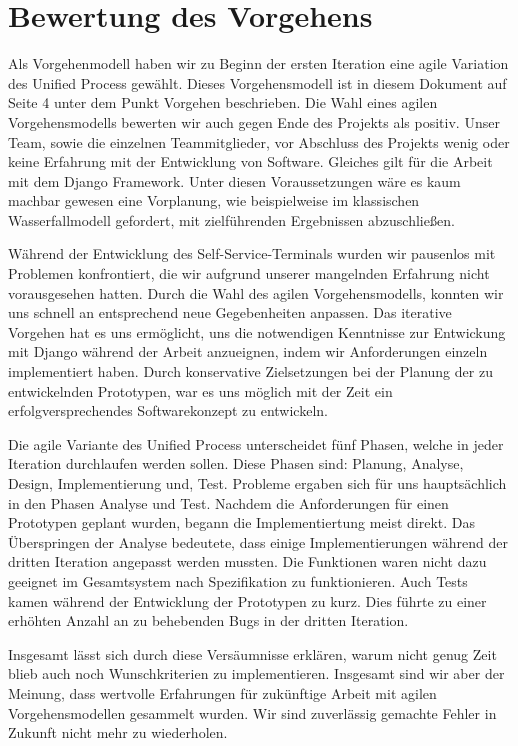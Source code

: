 \section{Bewertung des Vorgehens}

Als Vorgehenmodell haben wir zu Beginn der ersten Iteration eine agile Variation des Unified Process gewählt. Dieses Vorgehensmodell ist in diesem Dokument auf Seite 4 unter dem Punkt  \glqq Vorgehen\grqq{} beschrieben. Die Wahl eines agilen Vorgehensmodells bewerten wir auch gegen Ende des Projekts als positiv. Unser Team, sowie die einzelnen Teammitglieder, vor Abschluss des Projekts wenig oder keine Erfahrung mit der Entwicklung von Software. Gleiches gilt für die Arbeit mit dem Django Framework. Unter diesen Voraussetzungen wäre es kaum machbar gewesen eine Vorplanung, wie beispielweise im klassischen Wasserfallmodell gefordert, mit zielführenden Ergebnissen abzuschließen. \par
\noindent Während der Entwicklung des Self-Service-Terminals wurden wir pausenlos mit Problemen konfrontiert, die wir aufgrund unserer mangelnden Erfahrung nicht vorausgesehen hatten. Durch die Wahl des agilen Vorgehensmodells, konnten wir uns schnell an entsprechend neue Gegebenheiten anpassen. Das iterative Vorgehen hat es uns ermöglicht, uns die notwendigen Kenntnisse zur Entwickung mit Django während der Arbeit anzueignen, indem wir Anforderungen einzeln implementiert haben. Durch konservative Zielsetzungen bei der Planung der zu entwickelnden Prototypen, war es uns möglich mit der Zeit ein erfolgversprechendes Softwarekonzept zu entwickeln.\par
\noindent Die agile Variante des Unified Process unterscheidet fünf Phasen, welche in jeder Iteration durchlaufen werden sollen. Diese Phasen sind: \glqq Planung\grqq{}, \glqq Analyse\grqq{}, \glqq Design\grqq{}, \glqq Implementierung\grqq{} und, \glqq Test\grqq{}. Probleme ergaben sich für uns hauptsächlich in den Phasen \glqq Analyse\grqq{} und \glqq Test\grqq{}. Nachdem die Anforderungen für einen Prototypen geplant wurden, begann die Implementiertung meist direkt. Das Überspringen der Analyse bedeutete, dass einige Implementierungen während der dritten Iteration angepasst werden mussten. Die Funktionen waren nicht dazu geeignet im Gesamtsystem nach Spezifikation zu funktionieren. Auch Tests kamen während der Entwicklung der Prototypen zu kurz. Dies führte zu einer erhöhten Anzahl an zu behebenden Bugs in der dritten Iteration.\par
\noindent Insgesamt lässt sich durch diese Versäumnisse erklären, warum nicht genug Zeit blieb auch noch Wunschkriterien zu implementieren. Insgesamt sind wir aber der Meinung, dass wertvolle Erfahrungen für zukünftige Arbeit mit agilen Vorgehensmodellen gesammelt wurden. Wir sind zuverlässig gemachte Fehler in Zukunft nicht mehr zu wiederholen.

